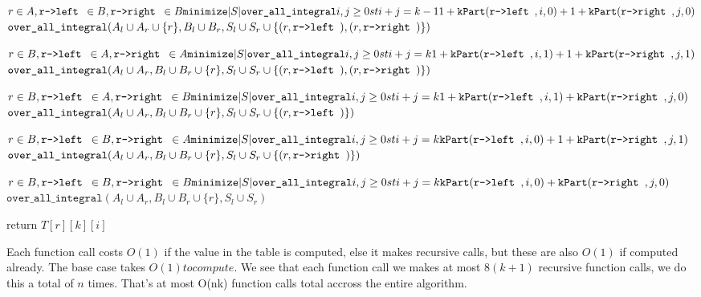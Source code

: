 \documentclass[11pt]{article}
\begin{document}
\begin{indentmore}
\begin{indentmore}
          $r \in A, \texttt{r->left } \in B, \texttt{r->right } \in B\\
              \texttt{minimize} |S| \texttt{over\_all\_integral} i,j \geq 0 st i+j = k-1\\
                1 + \mathtt{kPart}(\texttt{r->left },i,0) + 1 + \mathtt{kPart}(\texttt{r->right },j,0)$\\
                $\texttt{over\_all\_integral} (A_l \cup A_r \cup \{r\},B_l \cup B_r,S_l \cup S_r \cup \{(r, \texttt{r->left }),(r, \texttt{r->right })\})$

          $r \in B, \texttt{r->left } \in A, \texttt{r->right } \in A\\
              \texttt{minimize} |S| \texttt{over\_all\_integral} i,j \geq 0 st i+j = k\\
                1 + \mathtt{kPart}(\texttt{r->left },i,1) + 1 + \mathtt{kPart}(\texttt{r->right },j,1)$\\
                $\texttt{over\_all\_integral} (A_l \cup A_r,B_l \cup B_r \cup \{r\},S_l \cup S_r \cup \{(r, \texttt{r->left }),(r, \texttt{r->right })\})$

          $r \in B, \texttt{r->left } \in A, \texttt{r->right } \in B\\
              \texttt{minimize} |S| \texttt{over\_all\_integral} i,j \geq 0 st i+j = k\\
                1 + \mathtt{kPart}(\texttt{r->left },i,1) +     \mathtt{kPart}(\texttt{r->right },j,0)$\\
                $\texttt{over\_all\_integral} (A_l \cup A_r,B_l \cup B_r \cup \{r\},S_l \cup S_r \cup \{(r, \texttt{r->left })\})$

          $r \in B, \texttt{r->left } \in B, \texttt{r->right } \in A\\
              \texttt{minimize} |S| \texttt{over\_all\_integral} i,j \geq 0 st i+j = k\\
                    \mathtt{kPart}(\texttt{r->left },i,0) + 1 + \mathtt{kPart}(\texttt{r->right },j,1)$\\
                $\texttt{over\_all\_integral} (A_l \cup A_r,B_l \cup B_r \cup \{r\},S_l \cup S_r \cup \{(r, \texttt{r->right })\})$

          $r \in B, \texttt{r->left } \in B, \texttt{r->right } \in B\\
              \texttt{minimize} |S| \texttt{over\_all\_integral} i,j \geq 0 st i+j = k\\
                    \mathtt{kPart}(\texttt{r->left },i,0) +     \mathtt{kPart}(\texttt{r->right },j,0)$\\
                $\texttt{over\_all\_integral} (A_l \cup A_r,B_l \cup B_r \cup \{r\},S_l \cup S_r)$
        \end{indentmore}


   return $T[r][k][i]$
\end{indentmore}


Each function call costs $O(1)$ if the value in the table is computed, else it makes recursive calls, but these are also $O(1)$ if computed already.
The base case takes $O(1) to compute$. We see that each function call we makes at most $8(k+1)$ recursive function calls, we do this a total of $n$ times. That's at most O(nk) function calls total accross the entire algorithm.
\end{document}
